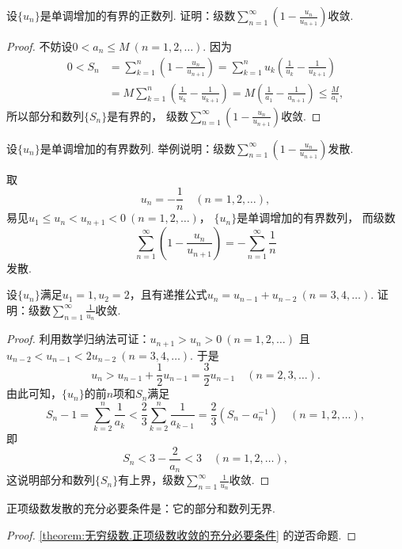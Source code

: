 \begin{example}
设\(\{u_n\}\)是单调增加的有界的正数列.
证明：级数\(\sum_{n=1}^\infty \left(1-\frac{u_n}{u_{n+1}}\right)\)收敛.
\begin{proof}
不妨设\(0 < a_n \leq M\ (n=1,2,\dotsc)\).
因为\begin{align*}
	0 < S_n &= \sum_{k=1}^n \left(1-\frac{u_n}{u_{n+1}}\right)
	= \sum_{k=1}^n u_k \left(\frac1{u_k} - \frac1{u_{k+1}}\right) \\
	&= M \sum_{k=1}^n \left(\frac1{u_k} - \frac1{u_{k+1}}\right)
	= M \left(\frac1{a_1} - \frac1{a_{n+1}}\right)
	\leq \frac{M}{a_1},
\end{align*}
所以部分和数列\(\{S_n\}\)是有界的，
级数\(\sum_{n=1}^\infty \left(1-\frac{u_n}{u_{n+1}}\right)\)收敛.
\end{proof}
\end{example}
\begin{example}
设\(\{u_n\}\)是单调增加的有界数列.
举例说明：级数\(\sum_{n=1}^\infty \left(1-\frac{u_n}{u_{n+1}}\right)\)发散.
\begin{solution}
取\[
	u_n = -\frac1n
	\quad(n=1,2,\dotsc),
\]
易见\(u_1 \leq u_n < u_{n+1} < 0\ (n=1,2,\dotsc)\)，
\(\{u_n\}\)是单调增加的有界数列，
而级数\[
	\sum_{n=1}^\infty \left(1-\frac{u_n}{u_{n+1}}\right)
	= -\sum_{n=1}^\infty \frac1n
\]发散.
\end{solution}
\end{example}

\begin{example}
设\(\{u_n\}\)满足\(u_1 = 1, u_2 = 2\)，且有递推公式\(u_n = u_{n-1} + u_{n-2}\ (n=3,4,\dotsc)\).
证明：级数\(\sum_{n=1}^\infty \frac1{u_n}\)收敛.
\begin{proof}
利用数学归纳法可证：\(u_{n+1} > u_n > 0\ (n=1,2,\dotsc)\)
且\(u_{n-2} < u_{n-1} < 2 u_{n-2}\ (n=3,4,\dotsc)\).
于是\[
	u_n > u_{n-1} + \frac12 u_{n-1} = \frac32 u_{n-1}
	\quad(n=2,3,\dotsc).
\]
由此可知，\(\{u_n\}\)的前\(n\)项和\(S_n\)满足\[
	S_n - 1 = \sum_{k=2}^n \frac1{a_k}
	< \frac23 \sum_{k=2}^n \frac1{a_{k-1}}
	= \frac23 (S_n - a_n^{-1})
	\quad(n=1,2,\dotsc),
\]
即\[
	S_n < 3 - \frac2{a_n} < 3
	\quad(n=1,2,\dotsc),
\]
这说明部分和数列\(\{S_n\}\)有上界，级数\(\sum_{n=1}^\infty \frac1{u_n}\)收敛.
\end{proof}
\end{example}

\begin{proposition}
正项级数发散的充分必要条件是：它的部分和数列无界.
\begin{proof}
\cref{theorem:无穷级数.正项级数收敛的充分必要条件} 的逆否命题.
\end{proof}
\end{proposition}

